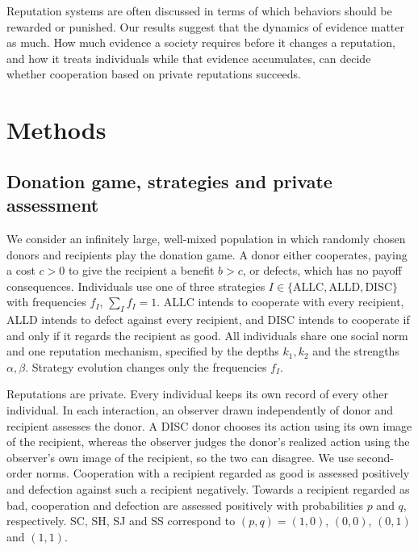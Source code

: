 \documentclass[fleqn,10pt]{wlscirep}
\newcommand{\ALLC}{\mathrm{ALLC}}
\newcommand{\ALLD}{\mathrm{ALLD}}
\newcommand{\DISC}{\mathrm{DISC}}
\theoremstyle{plain}
\begin{document}
Reputation systems are often discussed in terms of which behaviors should be rewarded or punished. Our results suggest that the dynamics of evidence matter as much. How much evidence a society requires before it changes a reputation, and how it treats individuals while that evidence accumulates, can decide whether cooperation based on private reputations succeeds.

\section*{Methods}
\label{sec:methods}

\subsection*{Donation game, strategies and private assessment}

We consider an infinitely large, well-mixed population in which randomly chosen donors and recipients play the donation game. A donor either cooperates, paying a cost $c>0$ to give the recipient a benefit $b>c$, or defects, which has no payoff consequences. Individuals use one of three strategies $I\in\{\ALLC,\ALLD,\DISC\}$ with frequencies $f_I$, $\sum_If_I=1$. ALLC intends to cooperate with every recipient, ALLD intends to defect against every recipient, and DISC intends to cooperate if and only if it regards the recipient as good. All individuals share one social norm and one reputation mechanism, specified by the depths $k_1,k_2$ and the strengths $\alpha,\beta$. Strategy evolution changes only the frequencies $f_I$.

Reputations are private\cite{okada2018,hilbe2018,radzvilavicius2019}. Every individual keeps its own record of every other individual. In each interaction, an observer drawn independently of donor and recipient assesses the donor. A DISC donor chooses its action using its own image of the recipient, whereas the observer judges the donor's realized action using the observer's own image of the recipient, so the two can disagree. We use second-order norms\cite{ohtsuki2004}. Cooperation with a recipient regarded as good is assessed positively and defection against such a recipient negatively. Towards a recipient regarded as bad, cooperation and defection are assessed positively with probabilities $p$ and $q$, respectively. SC, SH, SJ and SS correspond to $(p,q)=(1,0)$, $(0,0)$, $(0,1)$ and $(1,1)$.
\end{document}
